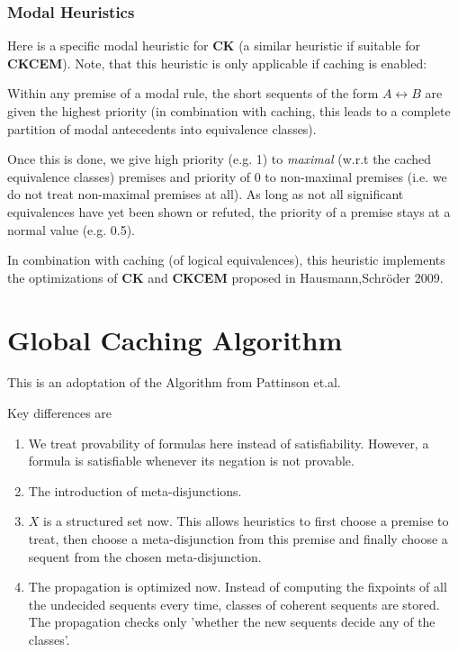 \documentclass{llncs}
\begin{document}
\subsubsection{Modal Heuristics}

Here is a specific modal heuristic for \textbf{CK} (a similar heuristic
if suitable for \textbf{CKCEM}). Note, that this heuristic is only applicable
if caching is enabled:

Within any premise of a modal rule, the short sequents of the form $A\leftrightarrow B$ are
given the highest priority (in combination with caching, this leads to a complete partition
of modal antecedents into equivalence classes).

Once this is done, we give high priority (e.g. 1) to \emph{maximal} (w.r.t the cached equivalence
classes) premises and priority of 0 to non-maximal premises (i.e. we do not treat non-maximal
premises at all). As long as not all significant equivalences have yet been shown or refuted,
the priority of a premise stays at a normal value (e.g. 0.5).

In combination with caching (of logical equivalences), this heuristic implements the
optimizations of \textbf{CK} and \textbf{CKCEM} proposed in Hausmann,Schr\"oder 2009.

\section{Global Caching Algorithm}

This is an adoptation of the Algorithm from Pattinson et.al.

Key differences are 

\begin{enumerate}
\item We treat provability of formulas here instead of satisfiability. However, a formula is 
satisfiable whenever its negation is not provable.
\item The introduction of meta-disjunctions.
\item $X$ is a structured set now. This allows heuristics to first choose a premise to treat,
then choose a meta-disjunction from this premise and finally choose a sequent from the chosen
meta-disjunction.
\item The propagation is optimized now. Instead of computing the fixpoints of all the
undecided sequents every time, classes of coherent sequents are stored. The propagation
checks only 'whether the new sequents decide any of the classes'.
\end{enumerate}
\end{document}
